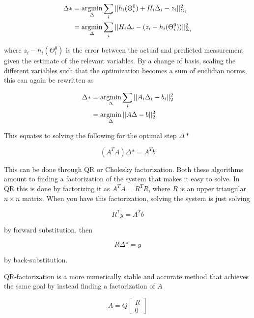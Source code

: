 \begin{align}
    \Delta* &= \operatorname*{argmin}_{\Delta}\sum_i ||h_i(\Theta_i^0) + H_i\Delta_i - z_i||_{\Sigma_i}^2 \\ 
    &= \operatorname*{argmin}_{\Delta}\sum_i || H_i\Delta_i - (z_i - h_i(\Theta_i^0))||_{\Sigma_i}^2
\end{align}

where $z_i - h_i(\Theta_i^0)$ is the error between the actual and predicted measurement given the estimate of the relevant variables. By a change of basis, scaling the different variables such that the optimization becomes a sum of euclidian norms, this can again be rewritten as 

\begin{align}
    \Delta* &= \operatorname*{argmin}_{\Delta}\sum_i||A_i\Delta_i - b_i||_2^2 \\
    &= \operatorname*{argmin}_{\Delta}||A\Delta - b||_2^2
\end{align}

This equates to solving the following for the optimal step $\Delta*$

\begin{equation}
    (A^TA)\Delta* = A^Tb
\end{equation}

This can be done through QR or Cholesky factorization. Both these algorithms amount to finding a factorization of the system that makes it easy to solve. In QR this is done by factorizing it as $A^TA = R^TR$, where $R$ is an upper triangular $n \times n$ matrix. When you have this factorization, solving the system is just solving 

\begin{equation}
    R^Ty = A^Tb
\end{equation}

by forward substitution, then 

\begin{equation}
    R\Delta* = y
\end{equation}

by back-substitution. 

QR-factorization is a more numerically stable and accurate method that achieves the same goal by instead finding a factorization of $A$ 

\begin{equation}
    A = Q\begin{bmatrix} R \\ 0 \end{bmatrix}
\end{equation}

